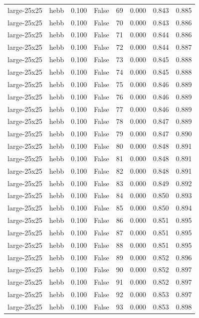 \begin{tabular}{llrrrrrr}
large-25x25 & hebb & 0.100 & False & 69 & 0.000 & 0.843 & 0.885 \\
large-25x25 & hebb & 0.100 & False & 70 & 0.000 & 0.843 & 0.886 \\
large-25x25 & hebb & 0.100 & False & 71 & 0.000 & 0.844 & 0.886 \\
large-25x25 & hebb & 0.100 & False & 72 & 0.000 & 0.844 & 0.887 \\
large-25x25 & hebb & 0.100 & False & 73 & 0.000 & 0.845 & 0.888 \\
large-25x25 & hebb & 0.100 & False & 74 & 0.000 & 0.845 & 0.888 \\
large-25x25 & hebb & 0.100 & False & 75 & 0.000 & 0.846 & 0.889 \\
large-25x25 & hebb & 0.100 & False & 76 & 0.000 & 0.846 & 0.889 \\
large-25x25 & hebb & 0.100 & False & 77 & 0.000 & 0.846 & 0.889 \\
large-25x25 & hebb & 0.100 & False & 78 & 0.000 & 0.847 & 0.889 \\
large-25x25 & hebb & 0.100 & False & 79 & 0.000 & 0.847 & 0.890 \\
large-25x25 & hebb & 0.100 & False & 80 & 0.000 & 0.848 & 0.891 \\
large-25x25 & hebb & 0.100 & False & 81 & 0.000 & 0.848 & 0.891 \\
large-25x25 & hebb & 0.100 & False & 82 & 0.000 & 0.848 & 0.891 \\
large-25x25 & hebb & 0.100 & False & 83 & 0.000 & 0.849 & 0.892 \\
large-25x25 & hebb & 0.100 & False & 84 & 0.000 & 0.850 & 0.893 \\
large-25x25 & hebb & 0.100 & False & 85 & 0.000 & 0.850 & 0.894 \\
large-25x25 & hebb & 0.100 & False & 86 & 0.000 & 0.851 & 0.895 \\
large-25x25 & hebb & 0.100 & False & 87 & 0.000 & 0.851 & 0.895 \\
large-25x25 & hebb & 0.100 & False & 88 & 0.000 & 0.851 & 0.895 \\
large-25x25 & hebb & 0.100 & False & 89 & 0.000 & 0.852 & 0.896 \\
large-25x25 & hebb & 0.100 & False & 90 & 0.000 & 0.852 & 0.897 \\
large-25x25 & hebb & 0.100 & False & 91 & 0.000 & 0.852 & 0.897 \\
large-25x25 & hebb & 0.100 & False & 92 & 0.000 & 0.853 & 0.897 \\
large-25x25 & hebb & 0.100 & False & 93 & 0.000 & 0.853 & 0.898 \\

\end{tabular}
